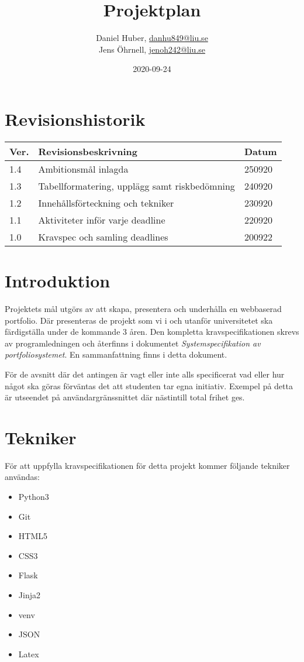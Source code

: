 \documentclass{TDP003mall}
\author{Daniel Huber, \url{danhu849@liu.se}\\
	Jens Öhrnell, \url{jenoh242@liu.se}}
\title{Projektplan}
\date{2020-09-24}
\begin{document}
\projectpage

\tableofcontents
\newpage



\section{Revisionshistorik}
\begin{table}[!h]
\begin{tabularx}{\linewidth}{|X|X|X|}
\hline
Ver. & Revisionsbeskrivning & Datum \\\hline
1.4 & Ambitionsmål inlagda & 250920\\\hline
1.3 & Tabellformatering, upplägg samt riskbedömning & 240920\\\hline
1.2 & Innehållsförteckning och tekniker & 230920\\\hline
1.1 & Aktiviteter inför varje deadline & 220920\\\hline
1.0 & Kravspec och samling deadlines & 200922 \\\hline
\end{tabularx}
\end{table}


\section{Introduktion}
Projektets mål utgörs av att skapa, presentera och underhålla en webbaserad portfolio. Där presenteras de projekt som vi i och utanför universitetet ska färdigställa under de kommande 3 åren. Den kompletta kravspecifikationen skrevs av programledningen och återfinns i dokumentet \textit{Systemspecifikation av portfoliosystemet}. En sammanfattning finns i detta dokument.

För de avsnitt där det antingen är vagt eller inte alls specificerat vad eller hur något ska göras förväntas det att studenten tar egna initiativ. Exempel på detta är utseendet på användargränssnittet där nästintill total frihet ges.

\section{Tekniker}
För att uppfylla kravspecifikationen för detta projekt kommer följande tekniker användas:
\begin{itemize}
\item Python3
\item Git
\item HTML5
\item CSS3
\item Flask
\item Jinja2
\item venv
\item JSON
\item Latex
\end{itemize}
\end{document}
